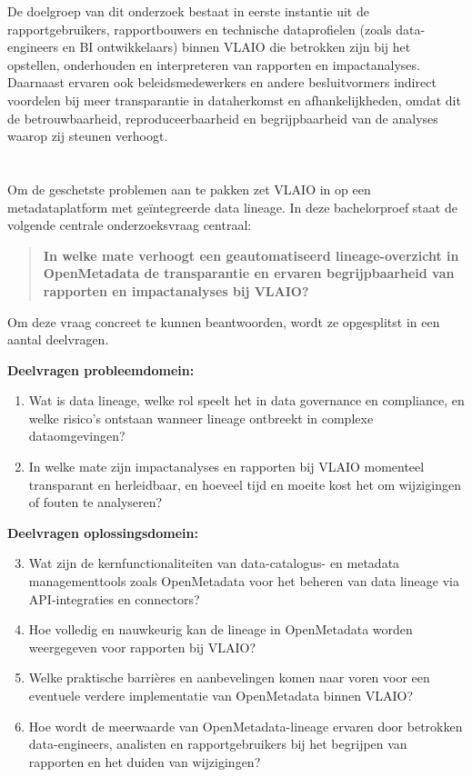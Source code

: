 De doelgroep van dit onderzoek bestaat in eerste instantie uit de rapportgebruikers, rapportbouwers en technische dataprofielen (zoals data-en\-gi\-neers en BI ont\-wik\-ke\-laars) binnen VLAIO die betrokken zijn bij het opstellen, onderhouden en interpreteren van rapporten en impactanalyses. Daarnaast ervaren ook beleidsmedewerkers en andere besluitvormers indirect voordelen bij meer transparantie in dataherkomst en afhankelijkheden, omdat dit de betrouwbaarheid, reproduceerbaarheid en begrijpbaarheid van de analyses waarop zij steunen verhoogt.

\section{}%
\label{sec:onderzoeksvraag}

Om de geschetste problemen aan te pakken zet VLAIO in op een metadataplatform met geïntegreerde data lineage. In deze bachelorproef staat de volgende centrale onderzoeksvraag centraal:

\begin{quote}
	\textbf{In welke mate verhoogt een geautomatiseerd li\-ne\-age-over\-zicht in OpenMetadata de transparantie en ervaren begrijpbaarheid van rapporten en impactanalyses bij VLAIO?}
\end{quote}

Om deze vraag concreet te kunnen beantwoorden, wordt ze opgesplitst in een aantal deelvragen.

\textbf{Deelvragen probleemdomein:}

\begin{enumerate}
	\item Wat is data lineage, welke rol speelt het in data governance en compliance, en welke risico's ontstaan wanneer lineage ontbreekt in complexe dataomgevingen?
	\item In welke mate zijn impactanalyses en rapporten bij VLAIO momenteel transparant en herleidbaar, en hoeveel tijd en moeite kost het om wijzigingen of fouten te analyseren?
\end{enumerate}

\textbf{Deelvragen oplossingsdomein:}

\begin{enumerate}
	\setcounter{enumi}{2}
	\item Wat zijn de kernfunctionaliteiten van data-catalogus- en metadata management\-tools zoals OpenMetadata voor het beheren van data lineage via API-integraties en connectors?
	\item Hoe volledig en nauwkeurig kan de lineage in OpenMetadata worden weergegeven voor rapporten bij VLAIO?
	\item Welke praktische barrières en aanbevelingen komen naar voren voor een eventuele verdere implementatie van OpenMetadata binnen VLAIO?
	\item Hoe wordt de meerwaarde van OpenMetadata-lineage ervaren door betrokken data-engineers, analisten en rapportgebruikers bij het begrijpen van rapporten en het duiden van wijzigingen?
\end{enumerate}

